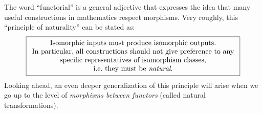     

The word ``functorial'' is a general adjective that expresses the idea
that many useful constructions in mathematics respect morphisms. Very
roughly, this ``principle of naturality'' can be stated as: 
\begin{gather*}
\boxed{\begin{array}{c}
\text{Isomorphic inputs must produce isomorphic outputs.}\\
\text{In particular, all constructions should not give preference to any}\\ \text{specific representatives of isomorphism classes,}\\
\text{i.e.\ they must be \emph{natural}.}
\end{array}}
\end{gather*}
Looking ahead, an even deeper generalization of this principle will arise when we go up to the level of \emph{morphisms between functors} (called natural transformations).


